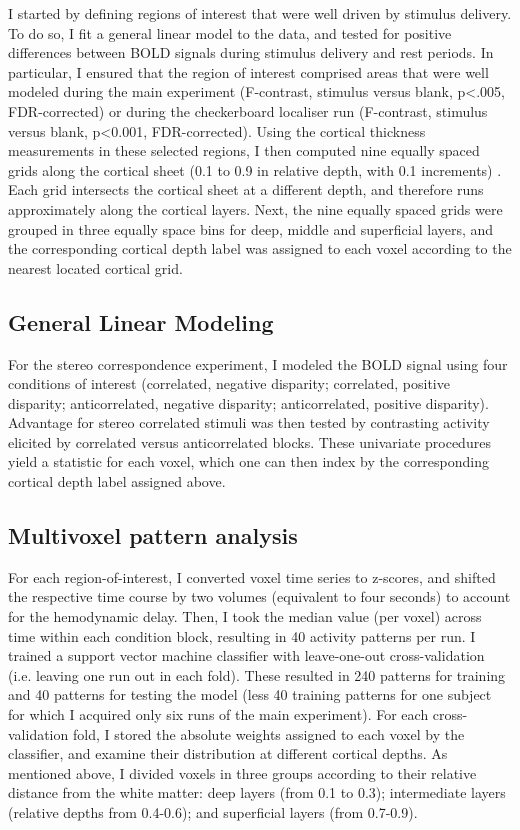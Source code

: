 I started by defining regions of interest that were well driven by stimulus delivery. To do so, I fit a general linear model to the data, and tested for positive differences between BOLD signals during stimulus delivery and rest periods. In particular, I ensured that the region of interest comprised areas that were well modeled during the main experiment (F-contrast, stimulus versus blank, p<.005, FDR-corrected) or during the checkerboard localiser run (F-contrast, stimulus versus blank, p<0.001, FDR-corrected).
Using the cortical thickness measurements in these selected regions, I then computed nine equally spaced grids along the cortical sheet (0.1 to 0.9 in relative depth, with 0.1 increments) \cite{Zimmermann:2011kl}. Each grid intersects the cortical sheet at a different depth, and therefore runs approximately along the cortical layers. Next, the nine equally spaced grids were grouped in three equally space bins for deep, middle and superficial layers, and the corresponding cortical depth label was assigned to each voxel according to the nearest located cortical grid.

\subsection{General Linear Modeling}
For the stereo correspondence experiment, I modeled the BOLD signal using four conditions of interest (correlated, negative disparity; correlated, positive disparity; anticorrelated, negative disparity; anticorrelated, positive disparity). Advantage for stereo correlated stimuli was then tested by contrasting activity elicited by correlated versus anticorrelated blocks. These univariate procedures yield a statistic for each voxel, which one can then index by the corresponding cortical depth label assigned above.

\subsection{Multivoxel pattern analysis}
For each region-of-interest, I converted voxel time series to z-scores, and shifted the respective time course by two volumes (equivalent to four seconds) to account for the hemodynamic delay. Then, I took the median value (per voxel) across time within each condition block, resulting in 40 activity patterns per run. I trained a support vector machine classifier with leave-one-out cross-validation (i.e. leaving one run out in each fold). These resulted in 240 patterns for training and 40 patterns for testing the model (less 40 training patterns for one subject for which I acquired only six runs of the main experiment). For each cross-validation fold, I stored the absolute weights assigned to each voxel by the classifier, and examine their distribution at different cortical depths. As mentioned above, I divided voxels in three groups according to their relative distance from the white matter: deep layers (from 0.1 to 0.3); intermediate layers (relative depths from 0.4-0.6); and superficial layers (from 0.7-0.9).

